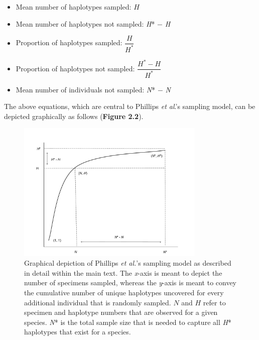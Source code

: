 \begin{itemize}

\item Mean number of haplotypes sampled: $H$

\vspace{1mm}

\item Mean number of haplotypes not sampled: \textit{H}* $-$ \textit{H}

\vspace{1mm}

\item Proportion of haplotypes sampled: $\dfrac{H}{H^*}$

\vspace{1mm}

\item Proportion of haplotypes not sampled: $\dfrac{H^*-H}{H^*}$

\vspace{1mm}

\item Mean number of individuals not sampled: \textit{N}* $-$ \textit{N}

\end{itemize}

\vspace{1mm}

\noindent The above equations, which are central to Phillips \textit{et al}.'s \cite{phillips2015exploration} sampling model, can be depicted graphically as follows (\textbf{Figure 2.2}).

\begin{figure}[H]
\centering
\includegraphics[width=0.8\textwidth]{Graph}
\caption[Visualization of Phillips \textit{et al.}'s \cite{phillips2015exploration} sampling model.]{Graphical depiction of Phillips \textit{et al.}'s \cite{phillips2015exploration} sampling model as described in detail within the main text. The \textit{x}-axis is meant to depict the number of specimens sampled, whereas the \textit{y}-axis is meant to convey the cumulative number of unique haplotypes uncovered for every additional individual that is randomly sampled. $N$ and $H$ refer to specimen and haplotype numbers that are observed for a given species. \textit{N}* is the total sample size that is needed to capture all \textit{H}* haplotypes that exist for a species.}
\end{figure}


